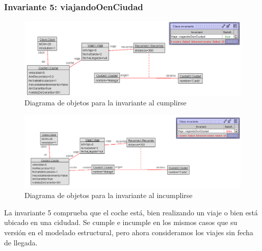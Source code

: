 \documentclass[12pt.a4paper]{article}
\begin{document}
\subsubsection{Invariante 5: viajandoOenCiudad}
\vspace{1.0 cm}
\begin{figure}[H]
     \includegraphics[width=1\linewidth]{Soils/dinamico_inv5_true.png}
     \caption{Diagrama de objetos para la invariante al cumplirse}
\end{figure}

\begin{figure}[H]
     \includegraphics[width=1\linewidth]{Soils/dinamico_inv5_false.png}
     \caption{Diagrama de objetos para la invariante al incumplirse}
\end{figure}

La invariante 5 comprueba que el coche está, bien realizando un viaje o bien está ubicado en una cidudad. Se cumple e incumple en los mismos casos que su versión en el modelado estructural, pero ahora consideramos los viajes sin fecha de llegada.
\end{document}
